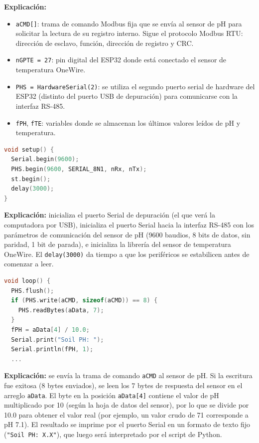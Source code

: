 \documentclass[11pt,a4paper]{article}
\begin{document}
\textbf{Explicación:}
\begin{itemize}
    \item \texttt{aCMD[]}: trama de comando Modbus fija que se envía
    al sensor de pH para solicitar la lectura de su registro
    interno. Sigue el protocolo Modbus RTU: dirección de esclavo,
    función, dirección de registro y CRC.
    \item \texttt{nGPTE = 27}: pin digital del ESP32 donde está
    conectado el sensor de temperatura OneWire.
    \item \texttt{PHS = HardwareSerial(2)}: se utiliza el segundo
    puerto serial de hardware del ESP32 (distinto del puerto USB de
    depuración) para comunicarse con la interfaz RS-485.
    \item \texttt{fPH}, \texttt{fTE}: variables donde se almacenan
    los últimos valores leídos de pH y temperatura.
\end{itemize}

\begin{lstlisting}[language=C++,caption={Método setup()}]
void setup() {
  Serial.begin(9600);
  PHS.begin(9600, SERIAL_8N1, nRx, nTx);
  st.begin();
  delay(3000);
}
\end{lstlisting}

\textbf{Explicación:} inicializa el puerto Serial de depuración (el
que verá la computadora por USB), inicializa el puerto Serial hacia
la interfaz RS-485 con los parámetros de comunicación del sensor de
pH (9600 baudios, 8 bits de datos, sin paridad, 1 bit de parada), e
inicializa la librería del sensor de temperatura OneWire. El
\texttt{delay(3000)} da tiempo a que los periféricos se estabilicen
antes de comenzar a leer.

\begin{lstlisting}[language=C++,caption={Método loop() - lectura de pH}]
void loop() {
  PHS.flush();
  if (PHS.write(aCMD, sizeof(aCMD)) == 8) {
    PHS.readBytes(aData, 7);
  }
  fPH = aData[4] / 10.0;
  Serial.print("Soil PH: ");
  Serial.println(fPH, 1);
  ...
\end{lstlisting}

\textbf{Explicación:} se envía la trama de comando \texttt{aCMD} al
sensor de pH. Si la escritura fue exitosa (8 bytes enviados), se
leen los 7 bytes de respuesta del sensor en el arreglo
\texttt{aData}. El byte en la posición \texttt{aData[4]} contiene el
valor de pH multiplicado por 10 (según la hoja de datos del sensor),
por lo que se divide por 10.0 para obtener el valor real (por
ejemplo, un valor crudo de 71 corresponde a pH 7.1). El resultado se
imprime por el puerto Serial en un formato de texto fijo
(\texttt{"Soil PH: X.X"}), que luego será interpretado por el script
de Python.
\end{document}
